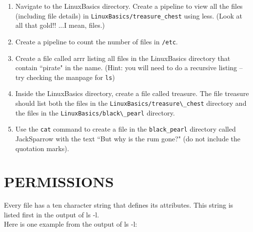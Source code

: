 \documentclass[11pt,a4paper]{article}
\begin{document}
\begin{enumerate}

\item Navigate to the LinuxBasics directory. Create a pipeline to view all the files (including file details) in \verb|LinuxBasics/treasure_chest| using less. (Look at all that gold!! ...I mean, files.) \\

\vspace*{3\baselineskip}

\item Create a pipeline to count the number of files in \verb|/etc|. \\

\vspace*{3\baselineskip}

\item Create a file called arrr listing all files in the LinuxBasics directory that contain ``pirate" in the name. (Hint: you will need to do a recursive listing -- try checking the manpage for \verb|ls|)\\

\vspace*{3\baselineskip}

\item Inside the LinuxBasics directory, create a file called treasure. The file treasure should list both the files in the \verb|LinuxBasics/treasure\_chest| directory and the files in the \verb|LinuxBasics/black\_pearl| directory. \\

\vspace*{3\baselineskip}

\item Use the \verb|cat| command to create a file in the \verb|black_pearl| directory called JackSparrow with the text ``But why is the rum gone?" (do not include the quotation marks).
\end{enumerate}



\pagebreak

\section{PERMISSIONS}

Every file has a ten character string that defines	its attributes. This string is listed first in the output of ls -l.\\
	
Here is one example from the output of ls -l:
\end{document}
